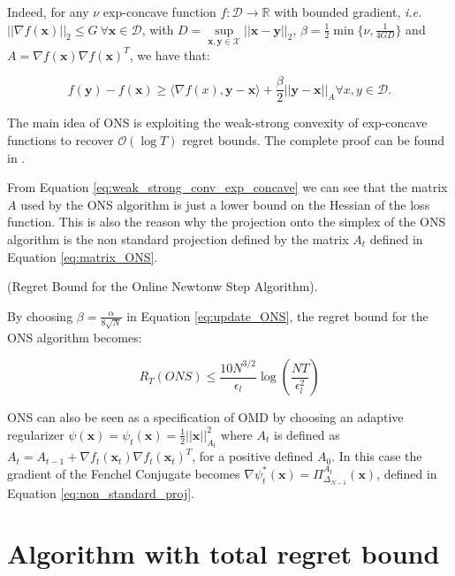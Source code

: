 Indeed, for any $\nu$ exp-concave function $f:\mathcal D\to\mathbb R$ with bounded gradient, \emph{i.e.} $||\nabla f(\mathbf x)||_2\le G\ \forall \mathbf x\in\mathcal D$, with $D=\sup\limits_{\mathbf x,\mathbf y\in\mathcal X}||\mathbf x-\mathbf y||_2$, $\beta=\frac{1}{2}\min\{\nu,\frac{1}{4GD}\}$ and $A=\nabla f(\mathbf x)\nabla f(\mathbf x)^T$, we have that: 

\begin{equation}\label{eq:weak_strong_conv_exp_concave}
f(\mathbf y)-f(\mathbf x)\ge\langle\nabla f(x),\mathbf y-\mathbf x\rangle+\frac{\beta}{2}||\mathbf y-\mathbf x||_{A}\forall x,y\in\mathcal D.
\end{equation}

The main idea of ONS is exploiting the weak-strong convexity of exp-concave functions to recover $\mathcal O(\log T)$ regret bounds. The complete proof can be found in \cite{hazan2007logarithmic}.

From Equation \eqref{eq:weak_strong_conv_exp_concave} we can see that the matrix $A$ used by the ONS algorithm is just a lower bound on the Hessian of the loss function. This is also the reason why the projection onto the simplex of the ONS algorithm is the non standard projection defined by the matrix $A_t$ defined in Equation \eqref{eq:matrix_ONS}.

\begin{theorem}(Regret Bound for the Online Newtonw Step Algorithm).

By choosing $\beta=\frac{\alpha}{8\sqrt{N}}$ in Equation \eqref{eq:update_ONS}, the regret bound for the ONS algorithm becomes:

\begin{equation}\label{eq:regret_ONS}
R_T(ONS)\le\frac{10 N^{3/2}}{\epsilon_l}\log\left(\frac{NT}{\epsilon_l^2}\right)
\end{equation}
\end{theorem}

ONS can also be seen as a specification of OMD \cite{luo2018efficient} by choosing an adaptive regularizer $\psi(\mathbf x)=\psi_t(\mathbf x)=\frac{1}{2}||\mathbf x||_{A_t}^2$ where $A_t$ is defined as $A_t=A_{t-1}+\nabla f_t(\mathbf x_t)\nabla f_t(\mathbf x_t)^T$, for a positive defined $A_0$. In this case the gradient of the Fenchel Conjugate becomes $\nabla \psi_t^*(\mathbf x)=\Pi^{A_t}_{\Delta_{N-1}}(\mathbf x)$, defined in Equation \eqref{eq:non_standard_proj}.

\section{Algorithm with total regret bound}

